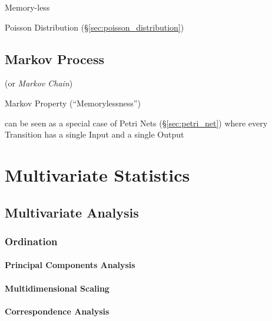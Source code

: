 Memory-less

Poisson Distribution (\S\ref{sec:poisson_distribution})



\subsection{Markov Process}\label{sec:markov_process}

(or \emph{Markov Chain})

Markov Property (``Memorylessness'')

can be seen as a special case of Petri Nets (\S\ref{sec:petri_net})
where every Transition has a single Input and a single Output



\section{Multivariate Statistics}\label{sec:multivariate_statistics}

\subsection{Multivariate Analysis}\label{sec:multivariate_analysis}

\subsubsection{Ordination}\label{sec:ordination}

\paragraph{Principal Components Analysis}
\label{sec:principal_components_analysis}\hfill

\paragraph{Multidimensional Scaling}\label{sec:multidimensional_scaling}\hfill

\paragraph{Correspondence Analysis}\label{sec:correspondence_analysis}\hfill


